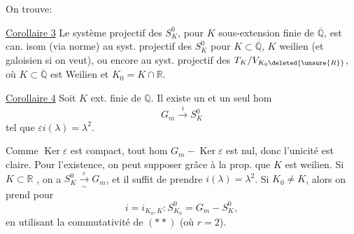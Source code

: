 
On trouve:

\uline{Corollaire 3} Le système projectif des $S_K^0$, pour $K$ sous-extension
finie de $\overline{\mathbb Q}$, est can. isom (via norme)
au syst. projectif des $S_K^0$ pour $K\subset\overline{\mathbb Q}$, $K$ weilien
(et galoisien si on veut), ou encore au syst. projectif des
 $T_K/V_{K_0\deleted{\unsure{R}}}$, où
$K\subset\overline{\mathbb Q}$ est Weilien et $K_0=K\cap\mathbb R$.

\uline{Corollaire 4} Soit $K$ ext. finie de $\mathbb Q$. Il existe un et un seul hom
\[
G_m\xrightarrow{i}S_K^0
\]
tel que $\varepsilon i(\lambda)=\lambda^2$.

Comme $\operatorname{Ker}\varepsilon$ est compact, tout hom
$G_m-\operatorname{Ker}\varepsilon$ est nul, donc l'unicité est claire.
Pour l'existence, on peut supposer grâce à la prop. que $K$ est weilien.
Si $K\subset\mathbb R$ , on a
$S_K^0\xrightarrow[\sim]{\varepsilon}G_m$, et il suffit de prendre $i(\lambda)=\lambda^2$.
Si $K_0\ne K$, alors on prend pour
\[
i=i_{K_0,K}:S_{K_0}^0=G_m-S_K^0,
\]
en utilisant la commutativité de $(**)$ (où $r=2$).
